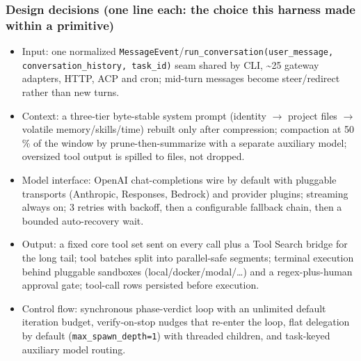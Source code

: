\subsubsection*{Design decisions (one line each: the choice this harness made within a primitive)}
\begin{itemize}
\item Input: one normalized \texttt{MessageEvent}/\texttt{run\_\allowbreak{}conversation(\allowbreak{}user\_\allowbreak{}message, conversation\_\allowbreak{}history, task\_\allowbreak{}id)} seam shared by CLI, \textasciitilde{}25 gateway adapters, HTTP, ACP and cron; mid-turn messages become steer/redirect rather than new turns.
\item Context: a three-tier byte-stable system prompt (identity $\rightarrow$ project files $\rightarrow$ volatile memory/skills/time) rebuilt only after compression; compaction at 50 \% of the window by prune-then-summarize with a separate auxiliary model; oversized tool output is spilled to files, not dropped.
\item Model interface: OpenAI chat-completions wire by default with pluggable transports (Anthropic, Responses, Bedrock) and provider plugins; streaming always on; 3 retries with backoff, then a configurable fallback chain, then a bounded auto-recovery wait.
\item Output: a fixed core tool set sent on every call plus a Tool Search bridge for the long tail; tool batches split into parallel-safe segments; terminal execution behind pluggable sandboxes (local/docker/modal/\ldots{}) and a regex-plus-human approval gate; tool-call rows persisted before execution.
\item Control flow: synchronous phase-verdict loop with an unlimited default iteration budget, verify-on-stop nudges that re-enter the loop, flat delegation by default (\texttt{max\_\allowbreak{}spawn\_\allowbreak{}depth=1}) with threaded children, and task-keyed auxiliary model routing.
\end{itemize}


